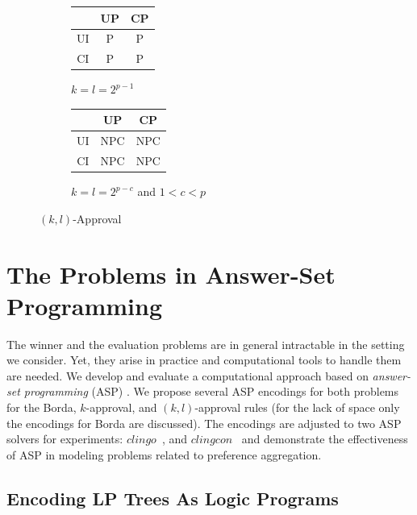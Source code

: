 \begin{figure}
	\centering
  \begin{subfigure}[b]{0.5\textwidth}
		\centering
		\begin{tabular}[0.5\textwidth]{ | c | c | c | }
		  \hline
		    & UP & CP \\
		  \hline
		  UI & P & P \\
		  \hline
		  CI & P & P \\
		  \hline
		\end{tabular}
		\label{fig:klApp_comp_a}
		\caption{$k=l=2^{p-1}$}
	\end{subfigure}%
  \begin{subfigure}[b]{0.5\textwidth}
		\centering
		\begin{tabular}[0.5\textwidth]{ | c | c | c | }
		  \hline
		    & UP & CP \\
		  \hline
		  UI & NPC & NPC \\
		  \hline
		  CI & NPC & NPC \\
		  \hline
		\end{tabular}
		\label{fig:klApp_comp_b}
		\caption{$k=l=2^{p-c}$ and $1 < c < p$}
	\end{subfigure}
	\caption{$(k,l)$-Approval}
	\label{fig:klApp_comp}
\end{figure}



\section{The Problems in Answer-Set Programming}

The winner and the evaluation problems are in general intractable in 
the setting we consider. Yet, they arise in practice and computational
tools to handle them are needed. We develop and evaluate
a computational approach based on \textit{answer-set programming} (ASP) 
\cite{mt99:stable}. We propose several ASP encodings for 
both problems for the Borda, $k$-approval, and
$(k,l)$-approval rules 
(for the lack of space only the encodings for Borda are discussed). 
The encodings are adjusted to two
ASP solvers for experiments: $\mathit{clingo}$~\cite{Gebser:clingo}, 
and $\mathit{clingcon}$~\cite{Ostrowski:clingcon} and demonstrate
the effectiveness of ASP in modeling problems related to preference 
aggregation.
  

\subsection{Encoding LP Trees As Logic Programs}

